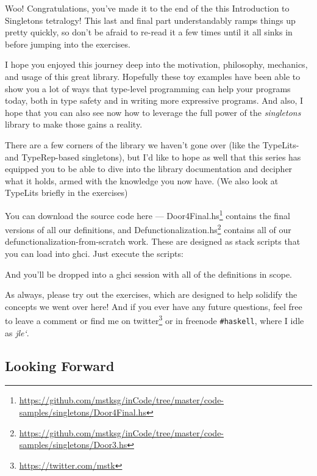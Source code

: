 \documentclass[]{article}
\newenvironment{Shaded}{}{}
\newcommand{\ExtensionTok}[1]{#1}
\newcommand{\NormalTok}[1]{#1}
\newcommand{\OperatorTok}[1]{\textcolor[rgb]{0.40,0.40,0.40}{#1}}
\renewcommand{\href}[2]{#2\footnote{\url{#1}}}
\begin{document}
Woo! Congratulations, you've made it to the end of the this Introduction to
Singletons tetralogy! This last and final part understandably ramps things up
pretty quickly, so don't be afraid to re-read it a few times until it all sinks
in before jumping into the exercises.

I hope you enjoyed this journey deep into the motivation, philosophy, mechanics,
and usage of this great library. Hopefully these toy examples have been able to
show you a lot of ways that type-level programming can help your programs today,
both in type safety and in writing more expressive programs. And also, I hope
that you can also see now how to leverage the full power of the
\emph{singletons} library to make those gains a reality.

There are a few corners of the library we haven't gone over (like the TypeLits-
and TypeRep-based singletons), but I'd like to hope as well that this series has
equipped you to be able to dive into the library documentation and decipher what
it holds, armed with the knowledge you now have. (We also look at TypeLits
briefly in the exercises)

You can download the source code here ---
\href{https://github.com/mstksg/inCode/tree/master/code-samples/singletons/Door4Final.hs}{Door4Final.hs}
contains the final versions of all our definitions, and
\href{https://github.com/mstksg/inCode/tree/master/code-samples/singletons/Door3.hs}{Defunctionalization.hs}
contains all of our defunctionalization-from-scratch work. These are designed as
stack scripts that you can load into ghci. Just execute the scripts:

\begin{Shaded}
\end{Shaded}

And you'll be dropped into a ghci session with all of the definitions in scope.

As always, please try out the exercises, which are designed to help solidify the
concepts we went over here! And if you ever have any future questions, feel free
to leave a comment or find me on \href{https://twitter.com/mstk}{twitter} or in
freenode \texttt{\#haskell}, where I idle as \emph{jle`}.

\hypertarget{looking-forward}{%
\subsection{Looking Forward}\label{looking-forward}}
\end{document}

